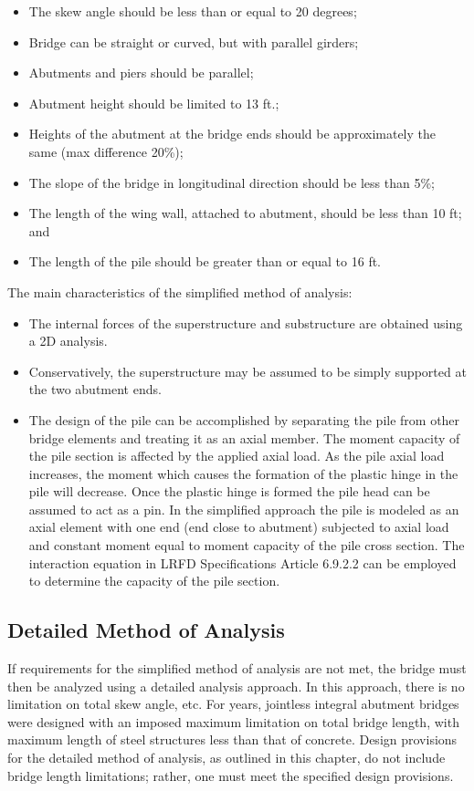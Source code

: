 \begin{itemize}
  \item The skew angle should be less than or equal to 20 degrees;
  \item Bridge can be straight or curved, but with parallel girders;
  \item Abutments and piers should be parallel;
  \item Abutment height should be limited to 13 ft.;
  \item Heights of the abutment at the bridge ends should be approximately the same (max difference 20\%);
  \item The slope of the bridge in longitudinal direction should be less than 5\%;
  \item The length of the wing wall, attached to abutment, should be less than 10 ft; and
  \item The length of the pile should be greater than or equal to 16 ft.
\end{itemize}

The main characteristics of the simplified method of analysis:

\begin{itemize}
  \item The internal forces of the superstructure and substructure are obtained using a 2D analysis.
  \item Conservatively, the superstructure may be assumed to be simply supported at the two abutment ends.
  \item The design of the pile can be accomplished by separating the pile from other bridge elements and treating it as
  an axial member. The moment capacity of the pile section is affected by the applied axial load. As the pile
  axial load increases, the moment which causes the formation of the plastic hinge in the pile will decrease.
  Once the plastic hinge is formed the pile head can be assumed to act as a pin. In the simplified approach the
  pile is modeled as an axial element with one end (end close to abutment) subjected to axial load and constant moment equal to moment capacity of the pile cross section. The interaction equation in LRFD Specifications
  Article 6.9.2.2 can be employed to determine the capacity of the pile section.
\end{itemize}

\subsection{Detailed Method of Analysis}
\label{sec:detailed-analysis}
If requirements for the simplified method of analysis are not met, the bridge must then be analyzed using a
detailed analysis approach. In this approach, there is no limitation on total skew angle, etc. For years, jointless integral
abutment bridges were designed with an imposed maximum limitation on total bridge length, with maximum length
of steel structures less than that of concrete. Design provisions for the detailed method of analysis, as outlined in this
chapter, do not include bridge length limitations; rather, one must meet the specified design provisions.

